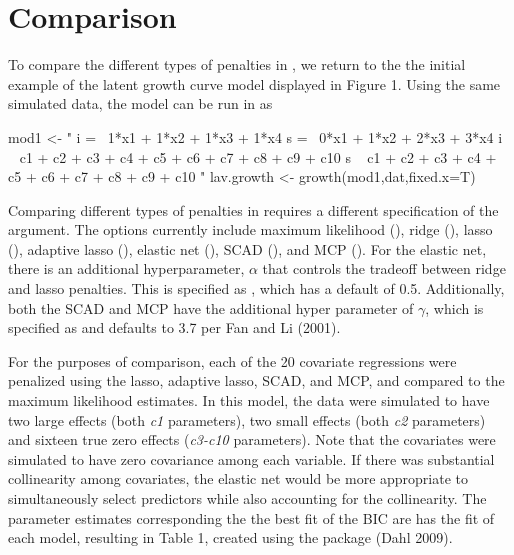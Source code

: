 \documentclass[article]{jss}
\begin{document}
\section{Comparison}\label{comparison}

To compare the different types of penalties in , we return
to the the initial example of the latent growth curve model displayed in
Figure 1. Using the same simulated data, the model can be run in
 as

\begin{CodeChunk}
\begin{CodeInput}
mod1 <- "
i =~ 1*x1 + 1*x2 + 1*x3 + 1*x4
s =~ 0*x1 + 1*x2 + 2*x3 + 3*x4
i ~ c1 + c2 + c3 + c4 + c5 + c6 + c7 + c8 + c9 + c10
s ~ c1 + c2 + c3 + c4 + c5 + c6 + c7 + c8 + c9 + c10
"
lav.growth <- growth(mod1,dat,fixed.x=T)
\end{CodeInput}
\end{CodeChunk}

Comparing different types of penalties in  requires a
different specification of the  argument. The options
currently include maximum likelihood (), ridge
(), lasso (), adaptive lasso
(), elastic net (), SCAD (),
and MCP (). For the elastic net, there is an additional
hyperparameter, \(\alpha\) that controls the tradeoff between ridge and
lasso penalties. This is specified as  , which has a
default of 0.5. Additionally, both the SCAD and MCP have the additional
hyper parameter of \(\gamma\), which is specified as  and
defaults to 3.7 per Fan and Li (2001).

For the purposes of comparison, each of the 20 covariate regressions
were penalized using the lasso, adaptive lasso, SCAD, and MCP, and
compared to the maximum likelihood estimates. In this model, the data
were simulated to have two large effects (both \textit{c1} parameters),
two small effects (both \textit{c2} parameters) and sixteen true zero
effects (\textit{c3-c10} parameters). Note that the covariates were
simulated to have zero covariance among each variable. If there was
substantial collinearity among covariates, the elastic net would be more
appropriate to simultaneously select predictors while also accounting
for the collinearity. The parameter estimates corresponding the the best
fit of the BIC are has the fit of each model, resulting in Table 1,
created using the  package (Dahl 2009).
\end{document}
